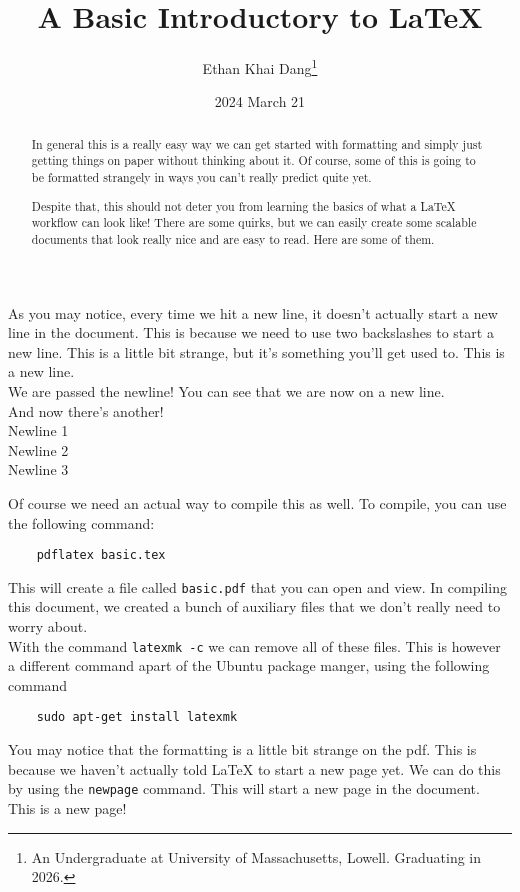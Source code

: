 \documentclass{article}
\title{A Basic Introductory to LaTeX}
\author{Ethan Khai Dang\thanks{An Undergraduate at University of Massachusetts, Lowell. Graduating in 2026.}}
\date{2024 March 21}
\begin{document}
\maketitle
\thispagestyle{empty} %
\newpage

\begin{abstract}
In general this is a really easy way we can get started with formatting and simply just getting things on paper without thinking about it.
Of course, some of this is going to be formatted strangely in ways you can't really predict quite yet.

Despite that, this should not deter you from learning the basics of what a LaTeX workflow can look like! There are some quirks,
but we can easily create some scalable documents that look really nice and are easy to read. Here are some of them.
\end{abstract}


As you may notice, every time we hit a new line, it doesn't actually start a new line in the document. This is because we need to use two backslashes to start a new line. This is a little bit strange, but it's something you'll get used to.
This is a new line.\\We are passed the newline! You can see that we are now on a new line.\\And now there's another!
\\Newline 1\\Newline 2\\Newline 3

Of course we need an actual way to compile this as well. To compile, you can use the following command:
\begin{verbatim}
    pdflatex basic.tex
\end{verbatim}
This will create a file called \texttt{basic.pdf} that you can open and view. In compiling this document, we created a bunch of auxiliary files that we don't really need to worry about.\\
With the command \texttt{latexmk -c} we can remove all of these files. This is however a different command apart of the Ubuntu package manger, using the following command
\begin{verbatim}
    sudo apt-get install latexmk
\end{verbatim}

You may notice that the formatting is a little bit strange on the pdf. This is because we haven't actually told LaTeX to start a new page yet. We can do this by using the \texttt{newpage} command. This will start a new page in the document.\\
\newpage
This is a new page!\\
\newpage
\end{document}
